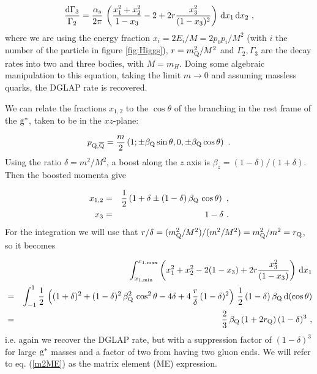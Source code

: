 \documentclass[a4paper,12pt]{article}
\begin{document}
\begin{equation}
\frac{{\mathrm d} \Gamma_3}{\Gamma_2} 
 = \frac{\alpha_{\mathrm{s}}}{2\pi} \, 
\left( \frac{x_1^2 + x_2^2}{1 - x_3} - 2 + 2r \frac{x_3^2}{(1 - x_3)^2} 
\right) \, {\mathrm d} x_1  \, {\mathrm d} x_2 ~,
\end{equation}
where we are using the energy fraction $ x_i=2E_i/M = 2p_0p_i/M^2 $ (with $i$ the number of the particle in figure \ref{fig:Higgs}), $r=m_{\mathrm Q}^2/M^2$ and $\Gamma_2, \Gamma_3$ are the decay rates into two and three bodies, with $M=m_H$. Doing some algebraic manipulation to this equation, taking the limit $m\to 0$ and assuming massless quarks, the DGLAP rate is recovered.

We can relate the fractions $x_{1,2}$ to the $\cos\theta$ of the branching in the rest frame of the ${\mathrm g}^*$, taken to be in the $xz$-plane:

\begin{equation}
p_{{\mathrm Q},\overline{\mathrm Q}} = \frac{m}{2} \left( 1; \pm \beta_{{\mathrm Q}} \sin\theta, 0, 
 \pm \beta_{{\mathrm Q}} \cos\theta \right) ~.
\label{kinp}
\end{equation}
Using the ratio $\delta=m^2/M^2$, a boost along the $z$ axis is $\beta_z=(1-\delta)/(1+\delta)$. Then the boosted momenta give

\begin{eqnarray}
x_{1,2} & = & \frac{1}{2} \left(1 + \delta \pm (1 - \delta)
\, \beta_{{\mathrm Q}} \, \cos\theta \right) ~, \label{kinx} \\
x_3 & = & 1 - \delta ~.
\end{eqnarray}
For the integration we will use that $r/\delta = (m_{{\mathrm Q}}^2 /M^2) / (m^2/M^2) = m_{{\mathrm Q}}^2/m^2 = r_{{\mathrm Q}}$, so it becomes

\begin{eqnarray}
 &  & \int_{x_{1,\mathrm{min}}}^{x_{1,\mathrm{max}}} \left( x_1^2 + x_2^2 - 2(1 - x_3) 
+ 2r \frac{x_3^2}{(1 - x_3)} \right)  \, {\mathrm d} x_1 \nonumber \\
& = & \int_{-1}^1 \frac{1}{2} \, \left( (1 + \delta)^2 
+ (1 - \delta)^2 \, \beta_{{\mathrm Q}}^2 \, \cos^2\theta - 4 \delta 
+ 4 \, \frac{r}{\delta} \, (1 - \delta)^2 \right) \, \frac{1}{2} 
\, (1 - \delta) \, \beta_{{\mathrm Q}} \, {\mathrm d}(\cos\theta) \nonumber \\
& = & \frac{2}{3} \, \beta_{{\mathrm Q}} \, (1 + 2 r_{{\mathrm Q}}) \, (1 - \delta)^3 ~, 
\label{m2ME} 
\end{eqnarray}
i.e. again we recover the DGLAP rate, but with a suppression factor of $(1-\delta)^3$ for large ${\mathrm g}^*$ masses and a factor of two from having two gluon ends. We will refer to eq. (\ref{m2ME}) as the matrix element (ME) expression.
\end{document}
